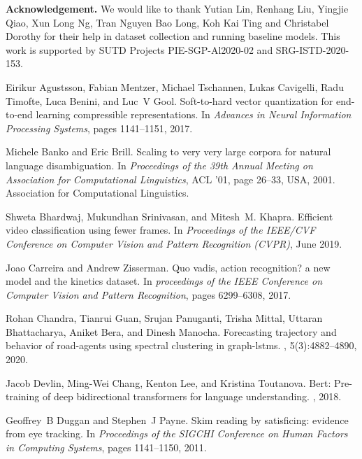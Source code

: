 \documentclass[final]{cvpr}
\begin{document}
{\bf Acknowledgement.} We would like to thank Yutian Lin, Renhang Liu, Yingjie Qiao, Xun Long Ng, Tran Nguyen Bao Long, Koh Kai Ting and Christabel Dorothy for their help in dataset collection and running baseline models. This work is supported by SUTD Projects PIE-SGP-Al2020-02 and SRG-ISTD-2020-153.

{\small
\begin{thebibliography}{10}\itemsep=-1pt

Eirikur Agustsson, Fabian Mentzer, Michael Tschannen, Lukas Cavigelli, Radu
  Timofte, Luca Benini, and Luc~V Gool.
\newblock Soft-to-hard vector quantization for end-to-end learning compressible
  representations.
\newblock In {\em Advances in Neural Information Processing Systems}, pages
  1141--1151, 2017.

Michele Banko and Eric Brill.
\newblock Scaling to very very large corpora for natural language
  disambiguation.
\newblock In {\em Proceedings of the 39th Annual Meeting on Association for
  Computational Linguistics}, ACL '01, page 26–33, USA, 2001. Association for
  Computational Linguistics.

Shweta Bhardwaj, Mukundhan Srinivasan, and Mitesh~M. Khapra.
\newblock Efficient video classification using fewer frames.
\newblock In {\em Proceedings of the IEEE/CVF Conference on Computer Vision and
  Pattern Recognition (CVPR)}, June 2019.

Joao Carreira and Andrew Zisserman.
\newblock Quo vadis, action recognition? a new model and the kinetics dataset.
\newblock In {\em proceedings of the IEEE Conference on Computer Vision and
  Pattern Recognition}, pages 6299--6308, 2017.

Rohan Chandra, Tianrui Guan, Srujan Panuganti, Trisha Mittal, Uttaran
  Bhattacharya, Aniket Bera, and Dinesh Manocha.
\newblock Forecasting trajectory and behavior of road-agents using spectral
  clustering in graph-lstms.
, 5(3):4882--4890, 2020.

Jacob Devlin, Ming-Wei Chang, Kenton Lee, and Kristina Toutanova.
\newblock Bert: Pre-training of deep bidirectional transformers for language
  understanding.
, 2018.

Geoffrey~B Duggan and Stephen~J Payne.
\newblock Skim reading by satisficing: evidence from eye tracking.
\newblock In {\em Proceedings of the SIGCHI Conference on Human Factors in
  Computing Systems}, pages 1141--1150, 2011.


\end{thebibliography}}
\end{document}
